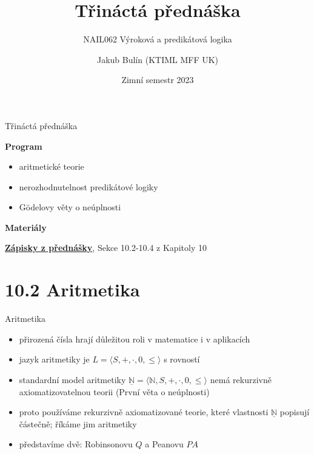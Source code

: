 \documentclass{beamer}
\title{Třináctá přednáška}
\subtitle{NAIL062 Výroková a predikátová logika}
\author{Jakub Bulín (KTIML MFF UK)}
\date{Zimní semestr 2023}
\begin{document}
\frame{\titlepage}


\begin{frame}{Třináctá přednáška}

    \textbf{Program}
        \begin{itemize}
            \item aritmetické teorie
            \item nerozhodnutelnost predikátové logiky
            \item Gödelovy věty o neúplnosti
        \end{itemize}      
    
    \textbf{Materiály}

        \href{https://github.com/jbulin-mff-uk/nail062/raw/main/lecture/lecture-notes/lecture-notes.pdf}{\alert{\textbf{Zápisky z přednášky}}}, Sekce 10.2-10.4 z Kapitoly 10

\end{frame}


\section{10.2 Aritmetika}


\begin{frame}{Aritmetika}

    \begin{itemize}
        \item přirozená čísla hrají důležitou roli v matematice i v aplikacích
        \item \alert{jazyk aritmetiky} je $L=\langle S,+,\cdot,0,\leq\rangle$ s rovností
        \item \alert{standardní model aritmetiky}  $\underline{\mathbb N}=\langle\mathbb N,S,+,\cdot,0,\leq\rangle$ nemá rekurzivně axiomatizovatelnou teorii (První věta o neúplnosti)
        \item proto používáme rekurzivně axiomatizované teorie, které vlastnosti $\underline{\mathbb N}$ popisují částečně; říkáme jim \alert{aritmetiky}       
        \item představíme dvě: \alert{Robinsonovu} $Q$ a \alert{Peanovu} $PA$
    \end{itemize}

\end{frame}
\end{document}
